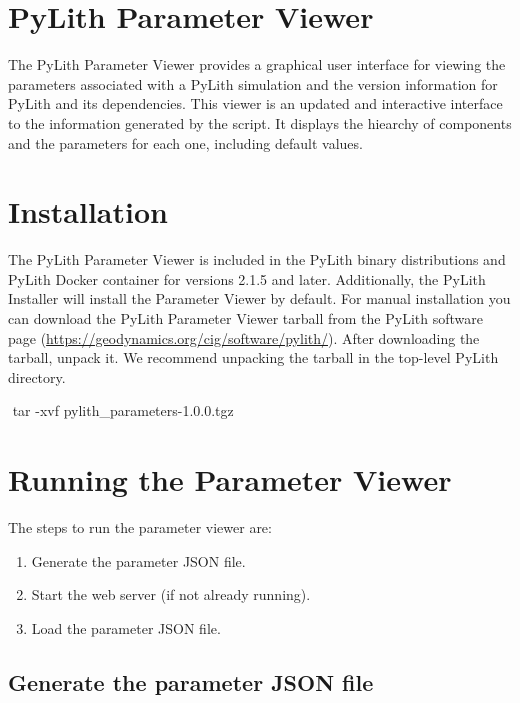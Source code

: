 \section{PyLith Parameter Viewer}
\label{sec:pylith:parameter:viewer}

The PyLith Parameter Viewer provides a graphical user interface for
viewing the parameters associated with a PyLith simulation and the
version information for PyLith and its dependencies. This viewer is
an updated and interactive interface to the information generated
by the  script. It displays the hiearchy of components
and the parameters for each one, including default values.


\section{Installation}

The PyLith Parameter Viewer is included in the PyLith binary
distributions and PyLith Docker container for versions 2.1.5 and
later. Additionally, the PyLith Installer will install the Parameter
Viewer by default.  For manual installation you can download the
PyLith Parameter Viewer tarball from the PyLith software page
(\url{https://geodynamics.org/cig/software/pylith/}).  After
downloading the tarball, unpack it. We recommend unpacking the tarball
in the top-level PyLith directory.
\begin{shell}
$$ tar -xvf pylith_parameters-1.0.0.tgz
\end{shell}

\section{Running the Parameter Viewer}

The steps to run the parameter viewer are:
\begin{enumerate}
\item Generate the parameter JSON file.
\item Start the web server (if not already running).
\item Load the parameter JSON file.
\end{enumerate}

\subsection{Generate the parameter JSON file}

